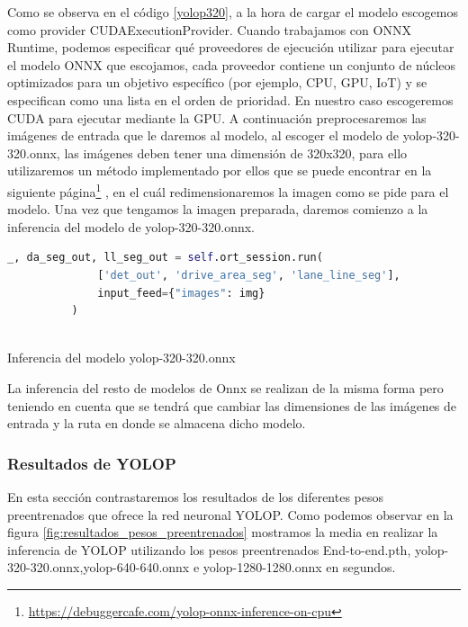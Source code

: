         Como se observa en el código \ref{yolop320}, a la hora de cargar el modelo escogemos como provider CUDAExecutionProvider. Cuando trabajamos con ONNX Runtime, 
        podemos especificar qué proveedores de ejecución utilizar para ejecutar el modelo ONNX que escojamos, cada proveedor contiene un conjunto de núcleos optimizados para un objetivo específico (por ejemplo, CPU, GPU, IoT) y 
        se especifican como una lista en el orden de prioridad. En nuestro caso escogeremos CUDA para ejecutar mediante la GPU. 
        \newline
        A continuación preprocesaremos las imágenes de entrada que le daremos al modelo, al escoger el modelo de yolop-320-320.onnx, las imágenes deben tener una dimensión de 320x320, para ello
        utilizaremos un método implementado por ellos que se puede encontrar en la siguiente página\footnote{\url{https://debuggercafe.com/yolop-onnx-inference-on-cpu}} , en el cuál redimensionaremos la imagen como se pide para el modelo. 
        Una vez que tengamos la imagen preparada, daremos comienzo a la inferencia del modelo de yolop-320-320.onnx. \newline
      
        \begin{code}[h]
          \begin{lstlisting}[language=Python]
            _, da_seg_out, ll_seg_out = self.ort_session.run(
              ['det_out', 'drive_area_seg', 'lane_line_seg'],
              input_feed={"images": img}
          )
        
          \end{lstlisting}
          \caption[Inferencia del modelo yolop-320-320.onnx]{Inferencia del modelo yolop-320-320.onnx}
          \label{cod:codejemplo}
          \end{code}  

        La inferencia del resto de modelos de Onnx se realizan de la misma forma pero teniendo en cuenta que se tendrá que cambiar las dimensiones de las imágenes de entrada y la ruta
        en donde se almacena dicho modelo. 


\subsubsection{Resultados de YOLOP }
\label{sec:resultados}
En esta sección contrastaremos los resultados de los diferentes pesos preentrenados que ofrece la red neuronal YOLOP. Como podemos observar en la figura \ref{fig:resultados_pesos_preentrenados} 
mostramos la media en realizar la inferencia de YOLOP utilizando los pesos preentrenados End-to-end.pth, yolop-320-320.onnx,yolop-640-640.onnx e yolop-1280-1280.onnx en segundos.

